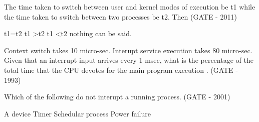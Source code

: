 
\begin{questyle}

  \question The time taken to switch between user and kernel modes of execution be t1 while the time taken to
            switch between two processes be t2. Then (GATE - 2011)

  \begin{oneparchoices}
    \choice t1=t2
    \choice t1 \textgreater  t2
    \CorrectChoice t1 \textless  t2
    \choice nothing can be said.
  \end{oneparchoices}


  \end{questyle}




\begin{questyle}

  \question Context switch takes 10 micro-sec. Interupt service execution takes  80 micro-sec.
          Given that an interrupt input arrives every 1 msec, what is the percentage  of the  total
          time that the CPU devotes for the main program execution \fillin[90\%]. (GATE - 1993)

  \end{questyle}




\begin{questyle}

  \question  Which of the following do not interupt a running process. (GATE - 2001)

  \begin{oneparchoices}
    \choice A device
    \choice Timer
    \CorrectChoice Schedular process
    \choice Power failure
  \end{oneparchoices}

  \end{questyle}



